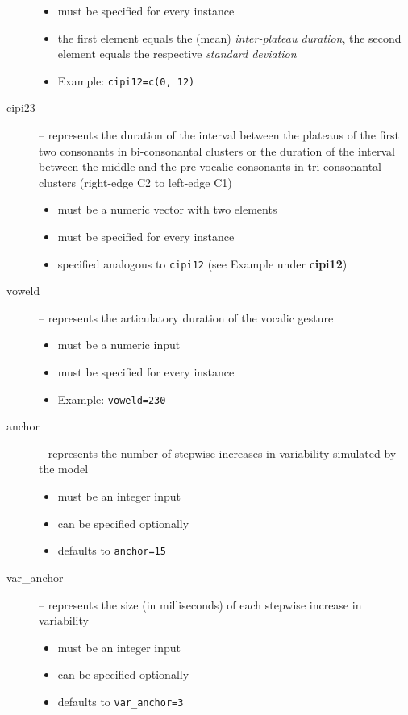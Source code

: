 \documentclass[
draft=false,
toc=graduated,
listof=totoc,
headsepline=true,
]%
{scrartcl}
\begin{document}
\begin{description}
\begin{itemize}
\item must be specified for every instance %
\item the first element equals the (mean) \emph{inter-plateau duration}, the second element equals the respective \emph{standard deviation}
\item Example: \texttt{cipi12=c(0, 12)}
\end{itemize}
\item[cipi23] -- represents the duration of the interval between the plateaus of the first two consonants in bi-consonantal clusters or the duration of the interval between the middle and the pre-vocalic consonants in tri-consonantal clusters (right-edge C2 to left-edge C1) 
\begin{itemize}
\item must be a numeric vector with two elements
\item must be specified for every instance
\item specified analogous to \texttt{cipi12} (see Example under \textbf{cipi12})
\end{itemize}
\item[voweld] -- represents the articulatory duration of the vocalic gesture
\begin{itemize}
\item must be a numeric input
\item must be specified for every instance
\item Example: \texttt{voweld=230}
\end{itemize}
\item[anchor] -- represents the number of stepwise increases in variability simulated by the model
\begin{itemize}
\item must be an integer input
\item can be specified optionally
\item defaults to \texttt{anchor=15}
\end{itemize}
\item[var\_anchor] -- represents the size (in milliseconds) of each stepwise increase in variability
\begin{itemize}
\item must be an integer input
\item can be specified optionally
\item defaults to \texttt{var\_anchor=3}
\end{itemize}

\end{description}
\end{document}
